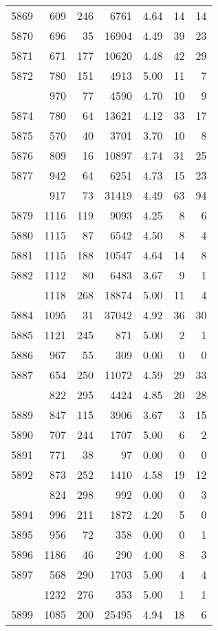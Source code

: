 \documentclass[
]{article}
\begin{document}
\begin{table}
\begin{tabular}[t]{lrrrrrr}
5869 & 609 & 246 & 6761 & 4.64 & 14 & 14\\
5870 & 696 & 35 & 16904 & 4.49 & 39 & 23\\
5871 & 671 & 177 & 10620 & 4.48 & 42 & 29\\
5872 & 780 & 151 & 4913 & 5.00 & 11 & 7\\
\addlinespace
5873 & 970 & 77 & 4590 & 4.70 & 10 & 9\\
5874 & 780 & 64 & 13621 & 4.12 & 33 & 17\\
5875 & 570 & 40 & 3701 & 3.70 & 10 & 8\\
5876 & 809 & 16 & 10897 & 4.74 & 31 & 25\\
5877 & 942 & 64 & 6251 & 4.73 & 15 & 23\\
\addlinespace
5878 & 917 & 73 & 31419 & 4.49 & 63 & 94\\
5879 & 1116 & 119 & 9093 & 4.25 & 8 & 6\\
5880 & 1115 & 87 & 6542 & 4.50 & 8 & 4\\
5881 & 1115 & 188 & 10547 & 4.64 & 14 & 8\\
5882 & 1112 & 80 & 6483 & 3.67 & 9 & 1\\
\addlinespace
5883 & 1118 & 268 & 18874 & 5.00 & 11 & 4\\
5884 & 1095 & 31 & 37042 & 4.92 & 36 & 30\\
5885 & 1121 & 245 & 871 & 5.00 & 2 & 1\\
5886 & 967 & 55 & 309 & 0.00 & 0 & 0\\
5887 & 654 & 250 & 11072 & 4.59 & 29 & 33\\
\addlinespace
5888 & 822 & 295 & 4424 & 4.85 & 20 & 28\\
5889 & 847 & 115 & 3906 & 3.67 & 3 & 15\\
5890 & 707 & 244 & 1707 & 5.00 & 6 & 2\\
5891 & 771 & 38 & 97 & 0.00 & 0 & 0\\
5892 & 873 & 252 & 1410 & 4.58 & 19 & 12\\
\addlinespace
5893 & 824 & 298 & 992 & 0.00 & 0 & 3\\
5894 & 996 & 211 & 1872 & 4.20 & 5 & 0\\
5895 & 956 & 72 & 358 & 0.00 & 0 & 1\\
5896 & 1186 & 46 & 290 & 4.00 & 8 & 3\\
5897 & 568 & 290 & 1703 & 5.00 & 4 & 4\\
\addlinespace
5898 & 1232 & 276 & 353 & 5.00 & 1 & 1\\
5899 & 1085 & 200 & 25495 & 4.94 & 18 & 6\\

\end{tabular}
\end{table}
\end{document}
